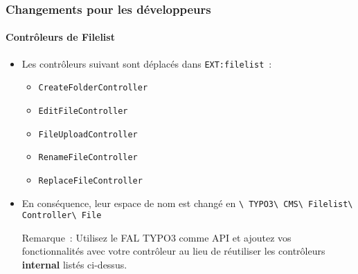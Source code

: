 
\begin{frame}[fragile]
	\frametitle{Changements pour les développeurs}
	\framesubtitle{Contrôleurs de Filelist}

	\begin{itemize}
		\item Les contrôleurs suivant sont déplacés dans \texttt{EXT:filelist}~:

			\begin{itemize}\small
				\item \texttt{CreateFolderController}
				\item \texttt{EditFileController}
				\item \texttt{FileUploadController}
				\item \texttt{RenameFileController}
				\item \texttt{ReplaceFileController}
			\end{itemize}\normalsize

		\item En conséquence, leur espace de nom est changé en\newline
			\texttt{\textbackslash
				TYPO3\textbackslash
				CMS\textbackslash
				Filelist\textbackslash
				Controller\textbackslash
				File}

		\vspace{0.2cm}

		\small
			Remarque~: Utilisez le FAL TYPO3 comme API et ajoutez vos fonctionnalités avec votre contrôleur
			au lieu de réutiliser les contrôleurs \textbf{internal} listés ci-dessus.
		\normalsize

	\end{itemize}

\end{frame}


